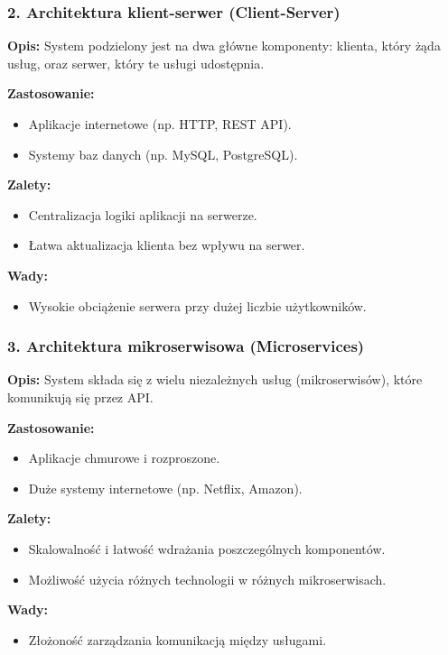 \subsubsection{2. Architektura klient-serwer (Client-Server)}
\textbf{Opis:}  
System podzielony jest na dwa główne komponenty: klienta, który żąda usług, oraz serwer, który te usługi udostępnia.

\textbf{Zastosowanie:}
\begin{itemize}
    \item Aplikacje internetowe (np. HTTP, REST API).
    \item Systemy baz danych (np. MySQL, PostgreSQL).
\end{itemize}

\textbf{Zalety:}
\begin{itemize}
    \item Centralizacja logiki aplikacji na serwerze.
    \item Łatwa aktualizacja klienta bez wpływu na serwer.
\end{itemize}

\textbf{Wady:}
\begin{itemize}
    \item Wysokie obciążenie serwera przy dużej liczbie użytkowników.
\end{itemize}

\subsubsection{3. Architektura mikroserwisowa (Microservices)}
\textbf{Opis:}  
System składa się z wielu niezależnych usług (mikroserwisów), które komunikują się przez API.

\textbf{Zastosowanie:}
\begin{itemize}
    \item Aplikacje chmurowe i rozproszone.
    \item Duże systemy internetowe (np. Netflix, Amazon).
\end{itemize}

\textbf{Zalety:}
\begin{itemize}
    \item Skalowalność i łatwość wdrażania poszczególnych komponentów.
    \item Możliwość użycia różnych technologii w różnych mikroserwisach.
\end{itemize}

\textbf{Wady:}
\begin{itemize}
    \item Złożoność zarządzania komunikacją między usługami.
\end{itemize}

